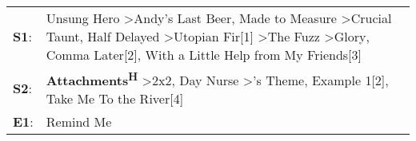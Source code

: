 \begin{supertabular}{p{0.03\textwidth}p{0.92\textwidth}}
 \textbf{S1}:  &  Unsung Hero\textsuperscript{} \textgreater \enspace Andy's Last Beer\textsuperscript{}, \enspace Made to Measure\textsuperscript{} \textgreater \enspace Crucial Taunt\textsuperscript{}, \enspace Half Delayed\textsuperscript{} \textgreater \enspace Utopian Fir[1]\textsuperscript{} \textgreater \enspace The Fuzz\textsuperscript{} \textgreater \enspace Glory\textsuperscript{}, \enspace Comma Later[2]\textsuperscript{}, \enspace With a Little Help from My Friends[3]\textsuperscript{}  \enspace  \\
 \textbf{S2}:  &                                                                                                                                                                                                                             \textbf{Attachments\textsuperscript{H}} \textgreater \enspace 2x2\textsuperscript{}, \enspace Day Nurse\textsuperscript{} \textgreater {}'s Theme\textsuperscript{}, \enspace Example 1[2]\textsuperscript{}, \enspace Take Me To the River[4]\textsuperscript{}  \enspace  \\
 \textbf{E1}:  &                                                                                                                                                                                                                                                                                                                                                                                                                                                                           Remind Me\textsuperscript{}  \enspace  \\
\end{supertabular}
